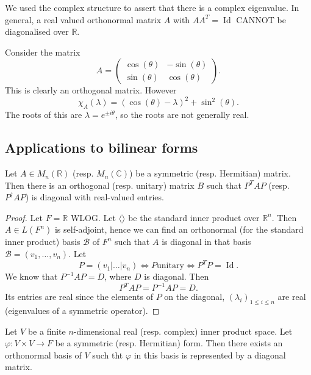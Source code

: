 \documentclass[a4paper]{scrartcl}
\begin{document}
\begin{remark}
      We used the complex structure to assert that there is a complex eigenvalue. In general, a real valued orthonormal matrix $A$ with $A A^T=\operatorname{Id}$ CANNOT be diagonalised over $\mathbb{R}$.
\end{remark}

\begin{example}
      Consider the matrix 
      \[A=\begin{pmatrix}
      \cos (\theta)&- \sin (\theta)\\
      \sin (\theta)&\cos (\theta)
      \end{pmatrix}
      .\]
      This is clearly an orthogonal matrix. However 
      \[\chi_A (\lambda)=(\cos (\theta)-\lambda)^2+\sin^2 (\theta).\]
      The roots of this are $\lambda=e^{\pm i \theta}$, so the roots are not generally real.
\end{example}

\subsection{Applications to bilinear forms}
\begin{corollary}
     Let $A \in M_n (\mathbb{R})$ (resp. $M_n (\mathbb{C})$) be a symmetric (resp. Hermitian) matrix. Then there is an orthogonal (resp. unitary) matrix $B$ such that $P^TAP$ (resp. $P^\dagger AP$) is diagonal with real-valued entries.
\end{corollary}
\begin{proof}
      Let $F=\mathbb{R}$ WLOG. Let $\langle  \rangle $ be the standard inner product over $\mathbb{R}^n$. Then $A \in L (F^n)$ is self-adjoint, hence we can find an orthonormal (for the standard inner product) basis $\mathcal{B} $ of $F^n$ such that $A$ is diagonal in that basis $\mathcal{B} =(v_1, \ldots ,v_n)$. Let 
      \[P= (v_1 | \ldots |v_n) \iff P \text{unitary} \iff P^TP=\operatorname{Id}.\]
      We know that ${P}^{-1}AP=D$, where $D$ is diagonal. Then 
      \[P^TAP={P}^{-1}AP=D.\]
      Its entries are real since the elements of $P$ on the diagonal, $(\lambda_i)_{1 \leq i \leq n}$ are real (eigenvalues of a symmetric operator).
\end{proof}

\begin{corollary}
     Let $V$ be a finite $n$-dimensional real (resp. complex) inner product space. Let $\varphi: V \times V \rightarrow F$ be a symmetric (resp. Hermitian) form. Then there exists an orthonormal basis of $V$ such tht $\varphi$ in this basis is represented by a diagonal matrix.
\end{corollary}
\end{document}
